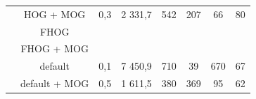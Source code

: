 \begin{table}[H]
\begin{tabular}{|c|c|c|c|c|c|c|c|}
                         & HOG + MOG  		&   0,3   &      2 331,7      & 542 & 207 &  66 &    80    \\ \cline{2-8} 
                         & FHOG       		&         &                   &     &     &     &          \\ \cline{2-8}  
                         & FHOG + MOG 		&         &                   &     &     &     &          \\ \cline{2-8} 
                         & default 		&   0,1   &      7 450,9      & 710 & 39  & 670 &    67    \\ \cline{2-8} 
                         & default + MOG 	&   0,5   &       1 611,5     & 380 & 369 & 95  &    62      \\ \hline
\end{tabular}
\end{table}


